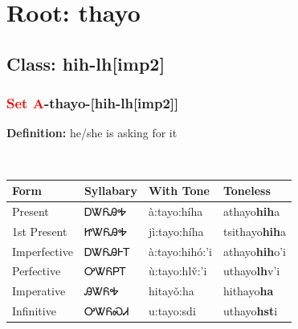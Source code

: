 \needspace{4in}
\section*{Root: thayo}
\nopagebreak
{}
\needspace{3in}
\subsection*{Class: hih-lh[imp2]}
\nopagebreak
\needspace{2in}
\subsubsection*{\textcolor{Red}{Set A}{-}\textbf{thayo}{-}[hih-lh[imp2]]}
\nopagebreak
\textbf{Definition: } he/she is asking for it
\\[0.5em]
\begin{tabularx}{\textwidth}{l X X X}%
\toprule%
\textbf{Form}&\textbf{Syllabary}&\textbf{With Tone}&\textbf{Toneless}\\%
\midrule%
Present&ᎠᏔᏲᎯᎭ&à:tayo:híha&athayo\textbf{hih}a\\%
1st Present&ᏥᏔᏲᎯᎭ&jì:tayo:híha&tsithayo\textbf{hih}a\\%
Imperfective&ᎠᏔᏲᎯᎰᎢ&à:tayo:hihó:’i&athayo\textbf{hih}o'i\\%
Perfective&ᎤᏔᏲᏢᎢ&ù:tayo:hlv̌:’i&uthayo\textbf{lh}v'i\\%
Imperative&ᎯᏔᏲᎭ&hitayǒ:ha&hithayo\textbf{ha}\\%
Infinitive&ᎤᏔᏲᏍᏗ&u:tayo:sdi&uthayo\textbf{hst}i\\%
\bottomrule%
\end{tabularx}
\\[1em]